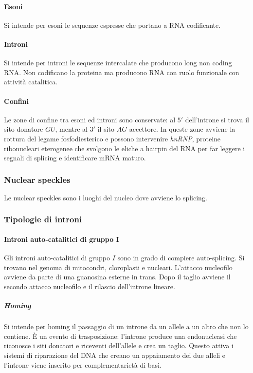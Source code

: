 			\paragraph{Esoni}
			Si intende per esoni le sequenze espresse che portano a RNA codificante.

			\paragraph{Introni}
			Si intende per introni le sequenze intercalate che producono long non coding RNA.
			Non codificano la proteina ma producono RNA con ruolo funzionale con attivit\`a catalitica.

			\paragraph{Confini}
			Le zone di confine tra esoni ed introni sono conservate: al $5'$ dell'introne si trova il sito donatore $GU$, mentre al $3'$ il sito $AG$ accettore.
			In queste zone avviene la rottura del legame fosfodiesterico e possono intervenire \emph{hnRNP}, proteine ribonucleari eterogenee che svolgono le eliche a hairpin del RNA per far leggere i segnali di splicing e identificare mRNA maturo.
		
		\subsubsection{Nuclear speckles}
		Le nuclear speckles sono i luoghi del nucleo dove avviene lo splicing.

		\subsubsection{Tipologie di introni}

			\paragraph{Introni auto-catalitici di gruppo $\mathbf{I}$}
			Gli introni auto-catalitici di gruppo $I$ sono in grado di compiere auto-splicing.
			Si trovano nel genoma di mitocondri, cloroplasti e nucleari.
			L'attacco nucleofilo avviene da parte di una guanosina esterne in trans.
			Dopo il taglio avviene il secondo attacco nucleofilo e il rilascio dell'introne lineare.

				\subparagraph{Homing}
				Si intende per homing il passaggio di un introne da un allele a un altro che non lo contiene.
				\`E un evento di trasposizione: l'introne produce una endonucleasi che riconosce i siti donatori e riceventi dell'allele e crea un taglio.
				Questo attiva i sistemi di riparazione del DNA che creano un appaiamento dei due alleli e l'introne viene inserito per complementariet\`a di basi.


